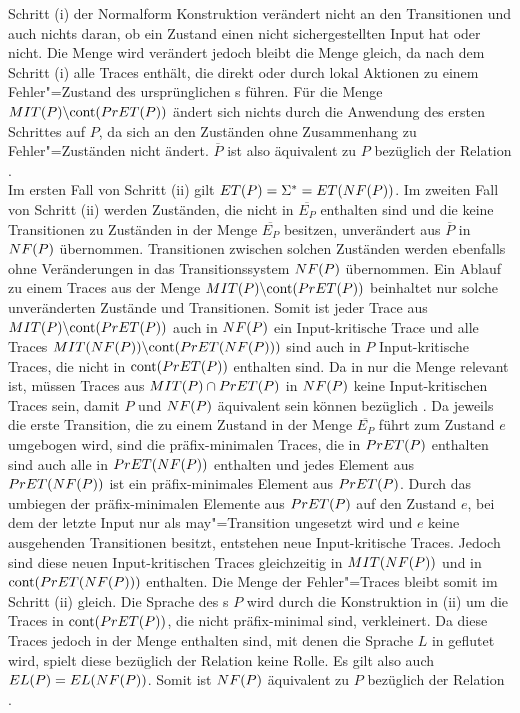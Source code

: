 Schritt (i) der Normalform Konstruktion verändert nicht an den Transitionen
und auch nichts daran, ob ein Zustand einen nicht sichergestellten Input hat
oder nicht. Die Menge \StET{} wird verändert jedoch bleibt die Menge \PrET{}
gleich, da \StET{} nach dem Schritt (i) alle Traces enthält, die direkt oder
durch lokal Aktionen zu einem Fehler"=Zustand des ursprünglichen \MEIO{}s
führen. Für die Menge $MIT (P)\backslash\mathrm{cont} (PrET (P))$ ändert sich nichts
durch die Anwendung des ersten Schrittes auf $P$, da sich an den Zuständen ohne
Zusammenhang zu Fehler"=Zuständen nicht ändert. $\overline{P}$ ist also
äquivalent zu $P$ bezüglich der Relation \ERel{}.\\
Im ersten Fall von Schritt (ii) gilt $ET (P) = \Sigma ^* = ET (NF (P))$. Im
zweiten Fall von Schritt (ii) werden Zuständen, die nicht in $\overline{E_P}$
enthalten sind und die keine Transitionen zu Zuständen in der Menge
$\overline{E_P}$ besitzen, unverändert aus $\overline{P}$ in $NF (P)$
übernommen. Transitionen zwischen solchen Zuständen werden ebenfalls ohne
Veränderungen in das Transitionssystem $NF (P)$ übernommen. Ein Ablauf zu
einem Traces aus der Menge $MIT (P)\backslash\mathrm{cont} (PrET (P))$ beinhaltet nur
solche unveränderten Zustände und Transitionen. Somit ist jeder Trace aus $MIT
(P)\backslash\mathrm{cont} (PrET (P))$ auch in $NF (P)$ ein Input-kritische Trace und
alle Traces $MIT (NF (P))\backslash\mathrm{cont} (PrET (NF (P)))$ sind auch in $P$
Input-kritische Traces, die nicht in $\mathrm{cont} (PrET (P))$ enthalten sind. Da in
\ERel{} nur die Menge \ET{} relevant ist, müssen Traces aus $MIT (P)\cap PrET
(P)$ in $NF (P)$ keine Input-kritischen Traces sein, damit $P$ und $NF (P)$
äquivalent sein können bezüglich \ERel{}. Da jeweils die erste Transition, die
zu einem Zustand in der Menge $\overline{E _P}$ führt zum Zustand $e$ umgebogen
wird, sind die präfix-minimalen Traces, die in $PrET (P)$ enthalten sind auch
alle in $PrET (NF (P))$ enthalten und jedes Element aus $PrET (NF (P))$ ist
ein präfix-minimales Element aus $PrET (P)$. Durch das umbiegen der
präfix-minimalen Elemente aus $PrET (P)$ auf den Zustand $e$, bei dem der
letzte Input nur als may"=Transition ungesetzt wird und $e$ keine ausgehenden
Transitionen besitzt, entstehen neue Input-kritische Traces. Jedoch sind diese
neuen Input-kritischen Traces gleichzeitig in $MIT (NF (P))$ und in $\mathrm{cont}
(PrET (NF (P)))$ enthalten. Die Menge der Fehler"=Traces \ET{} bleibt somit
im Schritt (ii) gleich. Die Sprache des \MEIO{}s $P$ wird durch die
Konstruktion in (ii) um die Traces in $\mathrm{cont} (PrET (P))$, die nicht
präfix-minimal sind, verkleinert. Da diese Traces jedoch in der Menge \ET{}
enthalten sind, mit denen die Sprache $L$ in \EL{} geflutet wird, spielt diese
bezüglich der Relation \ERel{} keine Rolle. Es gilt also auch $EL (P) = EL
(NF (P))$. Somit ist $NF (P)$ äquivalent zu $P$ bezüglich der Relation \ERel{}.

